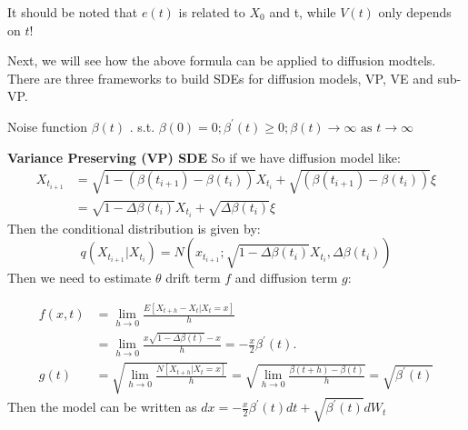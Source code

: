 It should be noted that $e(t)$ is related to $X_0$ and t, while $V(t)$ only depends on $t$!

Next, we will see how the above formula can be applied to diffusion modtels. There are three frameworks to build SDEs for diffusion models, VP, VE and sub-VP.
\begin{definition}
    Noise function  $\beta(t)$ . s.t. $\beta(0)=0 ; \beta^{\prime}(t) \geqslant 0 ; \beta(t) \rightarrow \infty \text { as } t \rightarrow \infty$
\end{definition}

\textbf{Variance Preserving (VP) SDE}
So if we have diffusion model like:
\begin{equation}
\begin{aligned}
    X_{t_{i+1}}&=\sqrt{1-\left(\beta\left(t_{i+1}\right)-\beta\left(t_{i}\right)\right)}X_{t_i}+\sqrt{\left(\beta\left(t_{i+1}\right)-\beta\left(t_{i}\right)\right)}\xi\\
    &=\sqrt{1-\Delta\beta(t_i)}X_{t_i}+\sqrt{\Delta \beta(t_i)}\xi
\end{aligned}
\end{equation}
Then the conditional distribution is given by:
\begin{equation}
    q\left(X_{t_{i+1}} | X_{t_{i}}\right)=N(x_{t_{i+1}} ; \sqrt{1-\Delta \beta\left(t_{i}\right)}X_{t_i}, \Delta \beta\left(t_{i}\right))
\end{equation}
Then we need to estimate  $\theta$  drift term  $f$  and diffusion term  $g$:

\begin{equation}
    \begin{aligned}
        f(x, t)&=\lim _{h \rightarrow 0} \frac{E\left[X_{t+h}-X_{t} | X_{t}=x\right]}{h} \\
            &=\lim _{h \rightarrow 0} \frac{x \sqrt{1-\Delta \beta(t)}-x}{h}=-\frac{x}{2} \beta^{\prime}(t) . \\
    g(t) &= \sqrt{\lim _{h \rightarrow 0} \frac{N\left[X_{t+h} | X_{t}=x\right]}{h}}=\sqrt{\lim _{h \rightarrow 0} \frac{\beta(t+h)-\beta(t)}{h}}=\sqrt{\beta^{\prime}(t)}
    \end{aligned}
\end{equation}
Then the model can be written as
$d x=-\frac{x}{2} \beta^{\prime}(t) d t+\sqrt{\beta^{\prime}(t)} d W_{t}$


